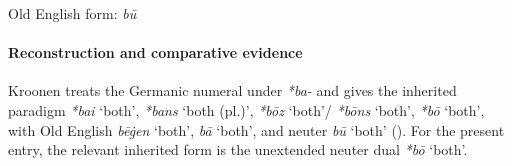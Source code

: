\documentclass[
  british,
  a4paper,
]{article}
\providecommand{\Recon}[1]{\emph{*#1}}
\begin{document}
\noindent{} \endgroup

Old English form: \emph{bū}

\paragraph{Reconstruction and comparative
evidence}\label{reconstruction-and-comparative-evidence-8}

Kroonen treats the Germanic numeral under \emph{*ba-} and gives the
inherited paradigm \Recon{bai} `both', \Recon{bans} `both (pl.)',
\Recon{bōz} `both'/ \Recon{bōns} `both', \Recon{bō} `both', with Old
English {\emph{bēġen}} `both', {\emph{bā}} `both', and neuter
{\emph{bū}} `both' (). For
the present entry, the relevant inherited form is the unextended neuter
dual {\emph{*bō}} `both'.
\end{document}
